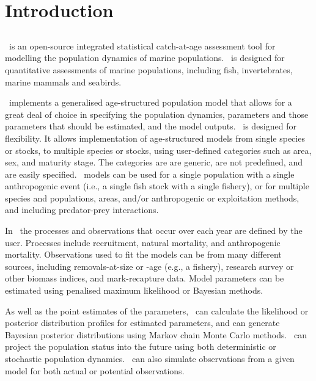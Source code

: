 \section{Introduction\label{sec:Introduction}}

\subsection{}

\CNAME\ is an open-source integrated statistical catch-at-age assessment tool for modelling the population dynamics of marine populations. \CNAME\ is designed for quantitative assessments of marine populations, including fish, invertebrates, marine mammals and seabirds.

\CNAME\ implements a generalised age-structured population model that allows for a great deal of choice in specifying the population dynamics, parameters and those parameters that should be estimated, and the model outputs. \CNAME\ is designed for flexibility. It allows implementation of age-structured models from single species or stocks, to multiple species or stocks, using user-defined categories such as area, sex, and maturity stage. The categories are are generic, are not predefined, and are easily specified. \CNAME\ models can be used for a single population with a single anthropogenic event (i.e., a single fish stock with a single fishery), or for multiple species and populations, areas, and/or anthropogenic or exploitation methods, and including predator-prey interactions.

In \CNAME\ the processes and observations that occur over each year are defined by the user. Processes include recruitment, natural mortality, and anthropogenic mortality. Observations used to fit the models can be from many different sources, including removals-at-size or -age (e.g., a fishery), research survey or other biomass indices, and mark-recapture data. Model parameters can be estimated using penalised maximum likelihood or Bayesian methods.

As well as the point estimates of the parameters, \CNAME\ can calculate the likelihood or posterior distribution profiles for estimated parameters, and can generate Bayesian posterior distributions using Markov chain Monte Carlo methods. \CNAME\ can project the population status into the future using both deterministic or stochastic population dynamics. \CNAME\ can also simulate observations from a given model for both actual or potential observations.

